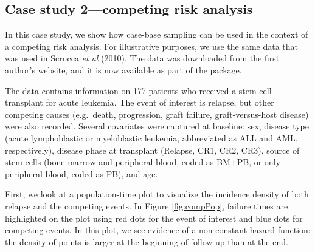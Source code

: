 \hypertarget{case-study-2competing-risk-analysis}{%
\subsection{Case study 2---competing risk analysis}\label{case-study-2competing-risk-analysis}}

In this case study, we show how case-base sampling can be used in the context of a competing risk analysis. For illustrative purposes, we use the same data that was used in Scrucca \emph{et al} (2010). The data was downloaded from the first author's website, and it is now available as part of the  package.

The data contains information on 177 patients who received a stem-cell transplant for acute leukemia. The event of interest is relapse, but other competing causes (e.g.~death, progression, graft failure, graft-versus-host disease) were also recorded. Several covariates were captured at baseline: sex, disease type (acute lymphoblastic or myeloblastic leukemia, abbreviated as ALL and AML, respectively), disease phase at transplant (Relapse, CR1, CR2, CR3), source of stem cells (bone marrow and peripheral blood, coded as BM+PB, or only peripheral blood, coded as PB), and age.

First, we look at a population-time plot to visualize the incidence density of both relapse and the competing events. In Figure \ref{fig:compPop}, failure times are highlighted on the plot using red dots for the event of interest and blue dots for competing events. In this plot, we see evidence of a non-constant hazard function: the density of points is larger at the beginning of follow-up than at the end.

